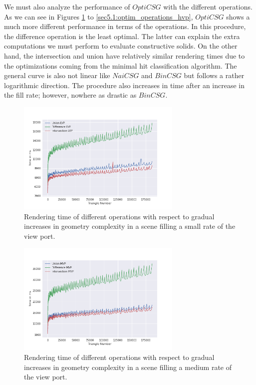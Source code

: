 \documentclass[a4paper,11pt,oneside]{article}
\begin{document}
We must also analyze the performance of $OptiCSG$ with the different operations. As we can see in Figures \ref{sec5.1:optim_operations_lvp} to \ref{sec5.1:optim_operations_hvp}, $OptiCSG$ shows a much more different performance in terms of the operations. In this procedure, the difference operation is the least optimal. The latter can explain the extra computations we must perform to evaluate constructive solids. On the other hand, the intersection and union have relatively similar rendering times due to the optimizations coming from the minimal hit classification algorithm. The general curve is also not linear like $NaiCSG$ and $BinCSG$ but follows a rather logarithmic direction. The procedure also increases in time after an increase in the fill rate; however, nowhere as drastic as $BinCSG$.

\begin{figure}[H]
	\centering
	\includegraphics[width=0.7\textwidth]{section5/plots/optim_csg_lvp.png}
	\caption{Rendering time of different operations with respect to gradual increases in geometry complexity in a scene filling a small rate of the view port.}
	\label{sec5.1:optim_operations_lvp}
\end{figure}

\begin{figure}[H]
	\centering
	\includegraphics[width=0.7\textwidth]{section5/plots/optim_csg_mvp.png}
	\caption{Rendering time of different operations with respect to gradual increases in geometry complexity in a scene filling a medium rate of the view port.}
	\label{sec5.1:optim_operations_mvp}
\end{figure}
\end{document}
